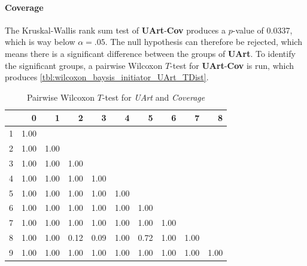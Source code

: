 \paragraph{Coverage}
The Kruskal-Wallis rank sum test of \textbf{UArt}-\textbf{Cov} produces a $p$-value of 0.0337, which is way below $\alpha=.05$. The null hypothesis can therefore be rejected, which means there is a significant difference between the groups of \textbf{UArt}. To identify the significant groups, a pairwise Wilcoxon $T$-test for \textbf{UArt}-\textbf{Cov} is run, which produces \cref{tbl:wilcoxon_baysis_initiator_UArt_TDist}. 
\begin{table}[ht]
	\small
	\centering
    \begin{tabular}{rrrrrrrrrr}
        \toprule
        & 0 & 1 & 2 & 3 & 4 & 5 & 6 & 7 & 8 \\ 
        \midrule
        1 & 1.00 &  &  &  &  &  &  &  &  \\ 
        2 & 1.00 & 1.00 &  &  &  &  &  &  &  \\ 
        3 & 1.00 & 1.00 & 1.00 &  &  &  &  &  &  \\ 
        4 & 1.00 & 1.00 & 1.00 & 1.00 &  &  &  &  &  \\ 
        5 & 1.00 & 1.00 & 1.00 & 1.00 & 1.00 &  &  &  &  \\ 
        6 & 1.00 & 1.00 & 1.00 & 1.00 & 1.00 & 1.00 &  &  &  \\ 
        7 & 1.00 & 1.00 & 1.00 & 1.00 & 1.00 & 1.00 & 1.00 &  &  \\ 
        8 & 1.00 & 1.00 & 0.12 & 0.09 & 1.00 & 0.72 & 1.00 & 1.00 &  \\ 
        9 & 1.00 & 1.00 & 1.00 & 1.00 & 1.00 & 1.00 & 1.00 & 1.00 & 1.00 \\ 
        \bottomrule
      \end{tabular}
    \caption{Pairwise Wilcoxon $T$-test for \textit{UArt} and \textit{Coverage}}
    \label{tbl:wilcoxon_baysis_initiator_UArt_Cov}
\end{table}
